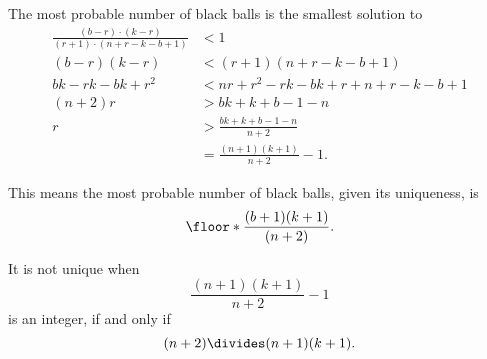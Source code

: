 \begin{enumerate}
          The most probable number of black balls is the smallest solution to
          \begin{align*}
              \frac{(b - r) \cdot (k - r)}{(r + 1) \cdot (n + r - k - b + 1)} & < 1                                          \\
              (b - r)(k - r)                                                  & < (r + 1)(n + r - k - b + 1)                 \\
              bk - rk - bk + r^2                                              & < nr + r^2 - rk - bk + r + n + r - k - b + 1 \\
              (n + 2)r                                                        & > bk + k + b - 1 - n                         \\
              r                                                               & > \frac{bk + k + b - 1 - n}{n + 2}           \\
                                                                              & = \frac{(n + 1)(k + 1)}{n + 2} - 1.
          \end{align*}

          This means the most probable number of black balls, given its uniqueness, is
          \[
              \floor*{\frac{(b + 1)(k + 1)}{(n + 2)}}.
          \]

          It is not unique when
          \[
              \frac{(n + 1)(k + 1)}{n + 2} - 1
          \]
          is an integer, if and only if
          \[
              (n + 2) \divides (n + 1)(k + 1).
          \]
\end{enumerate}